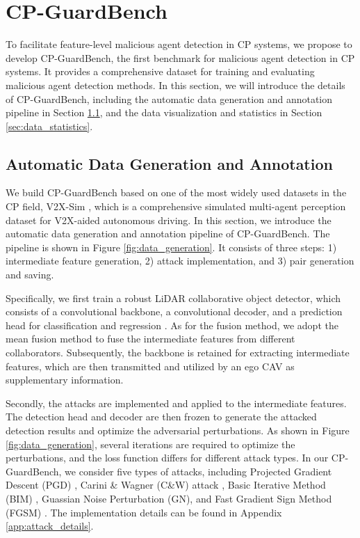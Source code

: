 

\section{CP-GuardBench}




To facilitate feature-level malicious agent detection in CP systems, we propose to develop CP-GuardBench, the first benchmark for malicious agent detection in CP systems. It provides a comprehensive dataset for training and evaluating malicious agent detection methods. 
In this section, we will introduce the details of CP-GuardBench, including the automatic data generation and annotation pipeline in Section \ref{sec:data_generation}, and the data visualization and statistics in Section \ref{sec:data_statistics}.

\subsection{Automatic Data Generation and Annotation}
\label{sec:data_generation}

We build CP-GuardBench based on one of the most widely used datasets in the CP field, V2X-Sim \citep{liV2XSimMultiAgentCollaborative2022}, which is a comprehensive simulated multi-agent perception dataset for V2X-aided autonomous driving. 
In this section, we introduce the automatic data generation and annotation pipeline of CP-GuardBench. The pipeline is shown in Figure \ref{fig:data_generation}. It consists of three steps: 1) intermediate feature generation, 2) attack implementation, and 3) pair generation and saving. 

Specifically, we first train a robust LiDAR collaborative object detector, which consists of a convolutional backbone, a convolutional decoder, and a prediction head for classification and regression \citep{Luo_2018_CVPR}. As for the fusion method, we adopt the mean fusion method to fuse the intermediate features from different collaborators.
Subsequently, the backbone is retained for extracting intermediate features, which are then transmitted and utilized by an ego CAV as supplementary information. 


Secondly, the attacks are implemented and applied to the intermediate features. 
The detection head and decoder are then frozen to generate the attacked detection results and optimize the adversarial perturbations. 
As shown in Figure \ref{fig:data_generation}, several iterations are required to optimize the perturbations, and the loss function differs for different attack types.
In our CP-GuardBench, we consider five types of attacks, including Projected Gradient Descent (PGD) \citep{madry2018towards}, Carini \& Wagner (C\&W) attack \citep{carlini2017evaluatingrobustnessneuralnetworks}, Basic Iterative Method (BIM) \citep{kurakin2017adversarialexamplesphysicalworld}, Guassian Noise Perturbation (GN), and Fast Gradient Sign Method (FGSM) \citep{goodfellow2015explainingharnessingadversarialexamples}. The implementation details can be found in Appendix \ref{app:attack_details}.



